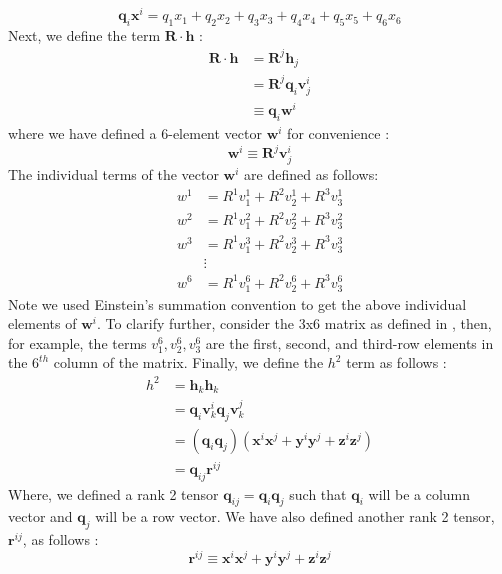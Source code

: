 \begin{equation}
\mathbf{q}_i \mathbf{x}^i = q_1x_1 + q_2x_2 + q_3x_3 + q_4x_4 + q_5x_5 + q_6x_6
\end{equation}
%
Next, we define the term $\mathbf{R} \cdot \mathbf{h}$ \cite{werner_poly}:
\begin{align}
\mathbf{R} \cdot \mathbf{h} &= \mathbf{R}^j \mathbf{h}_j\\
 &= \mathbf{R}^j \mathbf{q}_i \mathbf{v}_j^i\\
 &\equiv \mathbf{q}_i \mathbf{w}^i
\end{align}
%
where we have defined a 6-element vector $\mathbf{w}^i$ for convenience \cite{werner_poly}:
\begin{equation}
\label{w_tensor}
\mathbf{w}^i \equiv \mathbf{R}^j \mathbf{v}_j^i
\end{equation}
%
The individual terms of the vector $\mathbf{w}^i$ are defined as follows:
\begin{align*}
w^1 &= R^1v_1^1 + R^2v_2^1 + R^3v_3^1\\
w^2 &= R^1v_1^2 + R^2v_2^2 + R^3v_3^2\\
w^3 &= R^1v_1^3 + R^2v_2^3 + R^3v_3^3\\
& \vdots \\
w^6 &= R^1v_1^6 + R^2v_2^6 + R^3v_3^6
\end{align*}
%
Note we used Einstein's summation convention to get the above individual elements of $\mathbf{w}^i$. To clarify further, consider the 3x6 matrix as defined in , then, for example, the terms $v_1^6, v_2^6, v_3^6$ are the first, second, and third-row elements in the $6^{th}$ column of the matrix. Finally, we define the $h^2$ term as follows \cite{werner_poly}:
\begin{align}
h^2 &= \mathbf{h}_k \mathbf{h}_k \\
&= \mathbf{q}_i \mathbf{v}_k^i \mathbf{q}_j \mathbf{v}_k^j\\
&= (\mathbf{q}_i \mathbf{q}_j)(\mathbf{x}^i\mathbf{x}^j + \mathbf{y}^i\mathbf{y}^j + \mathbf{z}^i\mathbf{z}^j)\\
&= \mathbf{q}_{ij} \mathbf{r}^{ij}
\end{align}
%
Where, we defined a rank 2 tensor $\mathbf{q}_{ij} = \mathbf{q}_i \mathbf{q}_j$ such that $\mathbf{q}_i$ will be a column vector and $\mathbf{q}_j$ will be a row vector. We have also defined another rank 2 tensor, $\mathbf{r}^{ij}$, as follows \cite{werner_poly}:
\begin{equation}
\mathbf{r}^{ij} \equiv \mathbf{x}^i\mathbf{x}^j + \mathbf{y}^i\mathbf{y}^j + \mathbf{z}^i\mathbf{z}^j
\end{equation}
